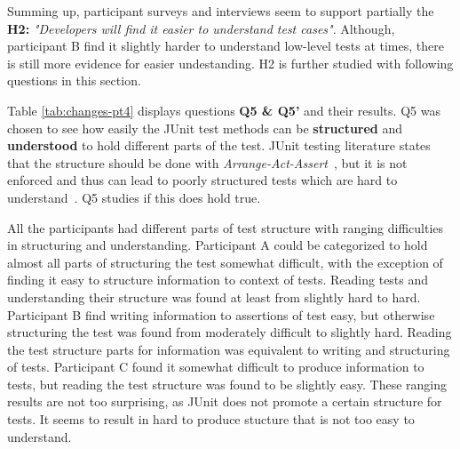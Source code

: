 Summing up, participant surveys and interviews seem to support partially the \textbf{H2:} \textit{"Developers will find it easier to understand test cases"}.
Although, participant B find it slightly harder to understand low-level tests at times, there is still more evidence for
easier undestanding. H2 is further studied with following questions in this section.

Table \ref{tab:changes-pt4} displays questions \textbf{Q5 \& Q5'} and their results. Q5 was chosen to see
how easily the JUnit test methods can be \textbf{structured} and \textbf{understood} to hold different parts of the test. JUnit testing literature states that
the structure should be done with \textit{Arrange-Act-Assert}~\cite{langr2015pragmatic}, but it is not enforced and thus can lead to poorly structured
tests which are hard to understand~\cite{kapelonis2016java}. Q5 studies if this does hold true.

All the participants had different parts of test
structure with ranging difficulties in structuring and understanding. Participant A could be categorized to hold almost all
parts of structuring the test somewhat difficult, with the exception of finding it easy to structure information to context of tests.
Reading tests and understanding their structure was found at least from slightly hard to hard.
Participant B find writing information to assertions of test easy, but otherwise structuring the test
was found from moderately difficult to slightly hard. Reading the test structure parts for information was equivalent
to writing and structuring of tests. Participant C found it somewhat difficult to produce information
to tests, but reading the test structure was found to be slightly easy. These ranging results are not too surprising,
as JUnit does not promote a certain structure for tests. It seems to result in hard to produce stucture that is not
too easy to understand.

